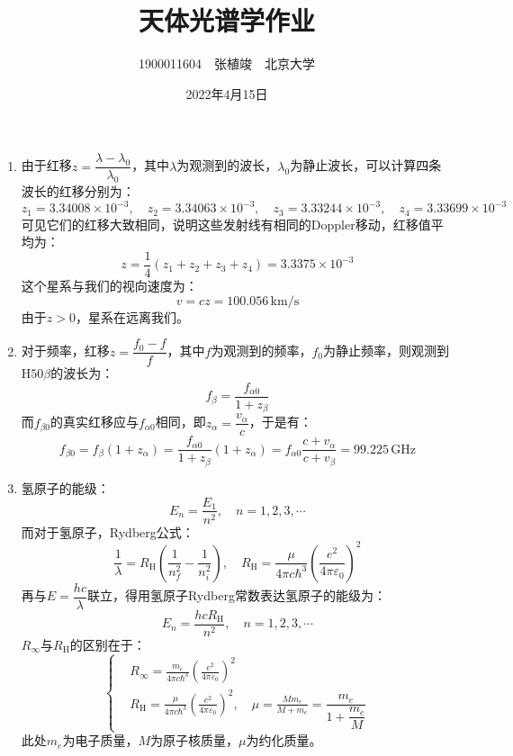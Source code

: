 \documentclass[a4paper]{article}
\renewcommand\epsilon\varepsilon
\begin{document}
\title{\textbf{天体光谱学作业}}
\author{1900011604\ \ 张植竣\ \ 北京大学}
\date{2022年4月15日}
\maketitle

\begin{enumerate}

    \item[1.]
    由于红移$z=\dfrac{\lambda - \lambda_0}{\lambda_0}$，其中$\lambda$为观测到的波长，$\lambda_0$为静止波长，可以计算四条波长的红移分别为：
    \[
        z_1 = 3.34008 \times 10^{-3},\quad
        z_2 = 3.34063 \times 10^{-3},\quad
        z_3 = 3.33244 \times 10^{-3},\quad
        z_4 = 3.33699 \times 10^{-3}
    \]
    可见它们的红移大致相同，说明这些发射线有相同的Doppler移动，红移值平均为：
    \[
        z = \frac{1}{4}(z_1 + z_2 + z_3 + z_4) = 3.3375 \times 10^{-3}
    \]
    这个星系与我们的视向速度为：
    \[
        v = cz = 100.056\,\mathrm{km/s}
    \]
    由于$z>0$，星系在远离我们。

    \bigskip
    \item[2.]
    对于频率，红移$z = \dfrac{f_0-f}{f}$，其中$f$为观测到的频率，$f_0$为静止频率，则观测到$\mathrm{H}50\beta$的波长为：
    \[
        f_\beta = \frac{f_{\alpha 0}}{1 + z_\beta}
    \]
    而$f_{\beta0}$的真实红移应与$f_{\alpha0}$相同，即$z_\alpha=\dfrac{v_\alpha}{c}$，于是有：
    \[
        f_{\beta0} = f_\beta(1 + z_\alpha) = \frac{f_{\alpha 0}}{1 + z_\beta}(1 + z_\alpha) = f_{\alpha0}\frac{c + v_\alpha}{c + v_\beta} = 99.225\,\mathrm{GHz}
    \]

    \bigskip
    \item[3.]
    氢原子的能级：
    \[
        E_n = \frac{E_1}{n^2},\quad
        n = 1, 2, 3, \cdots
    \]
    而对于氢原子，Rydberg公式：
    \[
        \frac{1}{\lambda} = R_\mathrm{H}\left(\frac{1}{n_f^2} - \frac{1}{n_i^2}\right),\quad
        R_\mathrm{H} = \frac{\mu}{4\pi c\hbar^3}\left(\frac{e^2}{4\pi\epsilon_0}\right)^{\!2}
    \]
    再与$E=\dfrac{hc}{\lambda}$联立，得用氢原子Rydberg常数表达氢原子的能级为：
    \[
        E_n = \frac{hcR_\mathrm{H}}{n^2},\quad
        n = 1, 2, 3, \cdots
    \]
    $R_\infty$与$R_\mathrm{H}$的区别在于：
    \[
        \left\{
            \begin{aligned}
                & R_\infty = \frac{m_e}{4\pi c\hbar^3}\left(\frac{e^2}{4\pi\epsilon_0}\right)^{\!2} \\
                & R_\mathrm{H} = \frac{\mu}{4\pi c\hbar^3}\left(\frac{e^2}{4\pi\epsilon_0}\right)^{\!2},\quad
                \mu = \frac{M m_e}{M + m_e} = \dfrac{m_e}{1 + \dfrac{m_e}{M}}
            \end{aligned}
        \right.
    \]
    此处$m_e$为电子质量，$M$为原子核质量，$\mu$为约化质量。


\end{enumerate}
\end{document}
